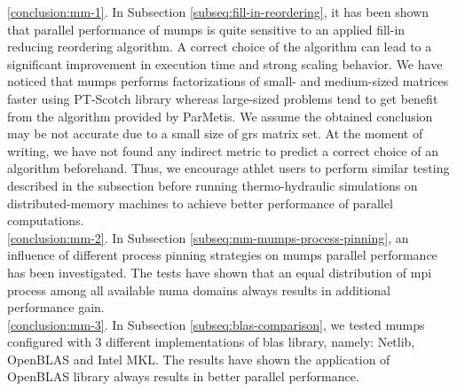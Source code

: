 \ref{conclusion:mm-1}. In Subsection \ref{subseq:fill-in-reordering}, it has been shown that parallel performance of \acrshort{mumps} is quite sensitive to an applied fill-in reducing reordering algorithm. A correct choice of the algorithm can lead to a significant improvement in execution time and strong scaling behavior. We have noticed that \acrshort{mumps} performs factorizations of small- and medium-sized matrices faster using PT-Scotch library whereas large-sized problems tend to get benefit from the algorithm provided by ParMetis. We assume the obtained conclusion may be not accurate due to a small size of \acrshort{grs} matrix set. At the moment of writing, we have not found any indirect metric to predict a correct choice of an algorithm beforehand. Thus, we encourage \acrshort{athlet} users to perform similar testing described in the subsection before running thermo-hydraulic simulations on distributed-memory machines to achieve better performance of parallel computations.\\




\ref{conclusion:mm-2}. In Subsection \ref{subseq:mm-mumps-process-pinning}, an influence of different process pinning strategies on \acrshort{mumps} parallel performance has been investigated. The tests have shown that an equal distribution of \acrshort{mpi} process among all available \acrshort{numa} domains always results in additional performance gain.\\ %


\ref{conclusion:mm-3}. 
In Subsection \ref{subseq:blas-comparison},
we tested \acrshort{mumps} configured with 3 different implementations of \acrshort{blas} library, namely: Netlib, OpenBLAS and Intel MKL. The results have shown the application of OpenBLAS library always results in better parallel performance.\\



